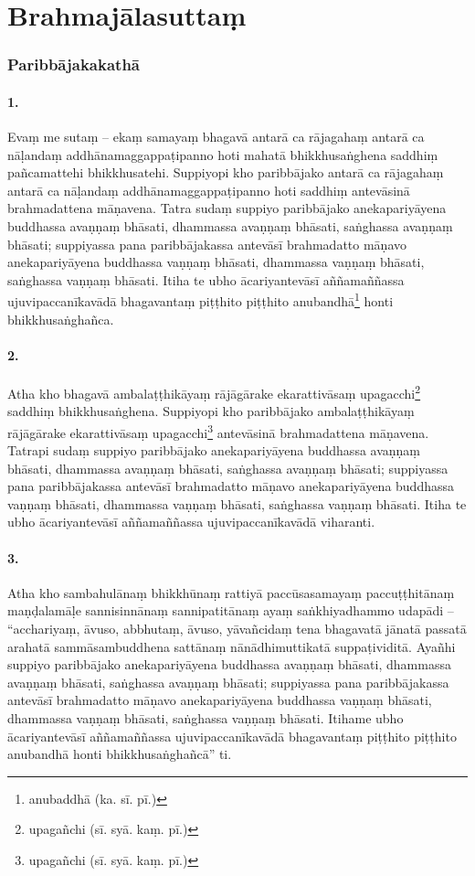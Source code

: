 \section{Brahmajālasuttaṃ}

\subsubsection{Paribbājakakathā}

\paragraph{1.}
Evaṃ me sutaṃ – ekaṃ samayaṃ bhagavā antarā ca rājagahaṃ antarā ca nāḷandaṃ addhānamaggappaṭipanno hoti mahatā bhikkhusaṅghena saddhiṃ pañcamattehi bhikkhusatehi. Suppiyopi kho paribbājako antarā ca rājagahaṃ antarā ca nāḷandaṃ addhānamaggappaṭipanno hoti saddhiṃ antevāsinā brahmadattena māṇavena. Tatra sudaṃ suppiyo paribbājako anekapariyāyena buddhassa avaṇṇaṃ bhāsati, dhammassa avaṇṇaṃ bhāsati, saṅghassa avaṇṇaṃ bhāsati; suppiyassa pana paribbājakassa antevāsī brahmadatto māṇavo anekapariyāyena buddhassa vaṇṇaṃ bhāsati, dhammassa vaṇṇaṃ bhāsati, saṅghassa vaṇṇaṃ bhāsati. Itiha te ubho ācariyantevāsī aññamaññassa ujuvipaccanīkavādā bhagavantaṃ piṭṭhito piṭṭhito anubandhā\footnote{anubaddhā (ka. sī. pī.)} honti bhikkhusaṅghañca.

\paragraph{2.}
Atha kho bhagavā ambalaṭṭhikāyaṃ rājāgārake ekarattivāsaṃ upagacchi\footnote{upagañchi (sī. syā. kaṃ. pī.)} saddhiṃ bhikkhusaṅghena. Suppiyopi kho paribbājako ambalaṭṭhikāyaṃ rājāgārake ekarattivāsaṃ upagacchi\footnote{upagañchi (sī. syā. kaṃ. pī.)} antevāsinā brahmadattena māṇavena. Tatrapi sudaṃ suppiyo paribbājako anekapariyāyena buddhassa avaṇṇaṃ bhāsati, dhammassa avaṇṇaṃ bhāsati, saṅghassa avaṇṇaṃ bhāsati; suppiyassa pana paribbājakassa antevāsī brahmadatto māṇavo anekapariyāyena buddhassa vaṇṇaṃ bhāsati, dhammassa vaṇṇaṃ bhāsati, saṅghassa vaṇṇaṃ bhāsati. Itiha te ubho ācariyantevāsī aññamaññassa ujuvipaccanīkavādā viharanti.

\paragraph{3.}
Atha kho sambahulānaṃ bhikkhūnaṃ rattiyā paccūsasamayaṃ paccuṭṭhitānaṃ maṇḍalamāḷe sannisinnānaṃ sannipatitānaṃ ayaṃ saṅkhiyadhammo udapādi – ``acchariyaṃ, āvuso, abbhutaṃ, āvuso, yāvañcidaṃ tena bhagavatā jānatā passatā arahatā sammāsambuddhena sattānaṃ nānādhimuttikatā suppaṭividitā. Ayañhi suppiyo paribbājako anekapariyāyena buddhassa avaṇṇaṃ bhāsati, dhammassa avaṇṇaṃ bhāsati, saṅghassa avaṇṇaṃ bhāsati; suppiyassa pana paribbājakassa antevāsī brahmadatto māṇavo anekapariyāyena buddhassa vaṇṇaṃ bhāsati, dhammassa vaṇṇaṃ bhāsati, saṅghassa vaṇṇaṃ bhāsati. Itihame ubho ācariyantevāsī aññamaññassa ujuvipaccanīkavādā bhagavantaṃ piṭṭhito piṭṭhito anubandhā honti bhikkhusaṅghañcā'' ti.

